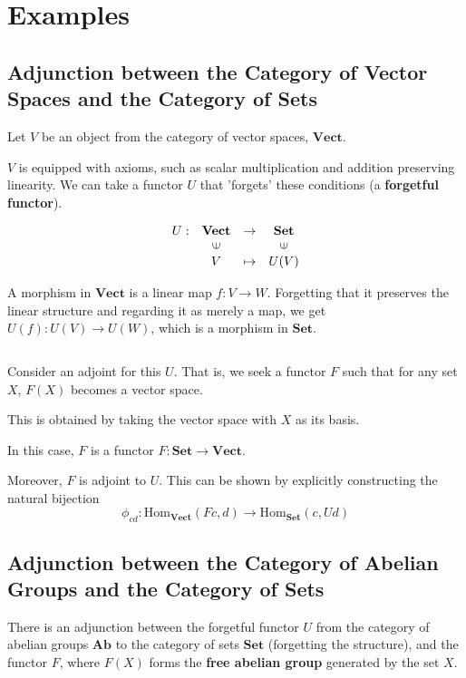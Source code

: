 \documentclass[uplatex,a4j,12pt,dvipdfmx]{jsarticle}
\begin{document}
\section{Examples}

\subsection{Adjunction between the Category of Vector Spaces and the Category of Sets}

Let $V$ be an object from the category of vector spaces, $\mathbf{Vect}$.

$V$ is equipped with axioms, such as scalar multiplication and addition preserving linearity.
We can take a functor $U$ that 'forgets' these conditions (a \textbf{forgetful functor}).

\[
	\begin{array}{cccc}
		U : & \textbf{Vect}           & \to     & \textbf{Set}            \\
		    & \rotatebox{90}{${\in}$} &         & \rotatebox{90}{${\in}$} \\
		    & V                       & \mapsto & U(V)
	\end{array}
\]

A morphism in $\textbf{Vect}$ is a linear map $f:V \to W$.
Forgetting that it preserves the linear structure and regarding it as merely a map,
we get $U(f):U(V) \to U(W)$, which is a morphism in $\textbf{Set}$.

${}$

Consider an adjoint for this $U$.
That is, we seek a functor $F$ such that for any set $X$, $F(X)$ becomes a vector space.

This is obtained by taking the vector space with $X$ as its basis.

In this case, $F$ is a functor $F : \mathbf{Set} \to \mathbf{Vect}$.

Moreover, $F$ is adjoint to $U$.
This can be shown by explicitly constructing the natural bijection
$$
	\phi_{cd} : \mathrm{Hom}_{\mathbf{Vect}}(Fc,d) \to \mathrm{Hom}_{\mathbf{Set}}(c,Ud)
$$


\subsection{Adjunction between the Category of Abelian Groups and the Category of Sets}

There is an adjunction between the forgetful functor $U$ from the category of abelian groups $\mathbf{Ab}$ to the category of sets $\mathbf{Set}$ (forgetting the structure),
and the functor $F$, where $F(X)$ forms the \textbf{free abelian group} generated by the set $X$.
\end{document}
